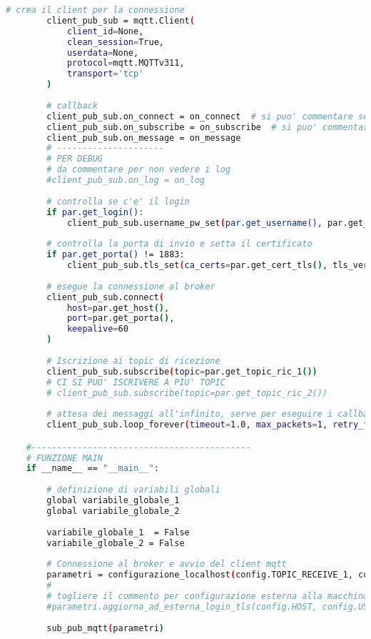 \begin{lstlisting}[language=bash]
        # crea il client per la connessione
        client_pub_sub = mqtt.Client(
            client_id=None,
            clean_session=True,
            userdata=None,
            protocol=mqtt.MQTTv311,
            transport='tcp'
        )
    
        # callback
        client_pub_sub.on_connect = on_connect  # si puo' commentare se non interessa
        client_pub_sub.on_subscribe = on_subscribe  # si puo' commentare se non interessa
        client_pub_sub.on_message = on_message
        # --------------------- 
        # PER DEBUG
        # da commentare per non vedere i log
        #client_pub_sub.on_log = on_log
    
        # controlla se c'e' il login
        if par.get_login():
            client_pub_sub.username_pw_set(par.get_username(), par.get_password())
    
        # controlla la porta di invio e setta il certificato
        if par.get_porta() != 1883:
            client_pub_sub.tls_set(ca_certs=par.get_cert_tls(), tls_version=2)
    
        # esegue la connessione al broker
        client_pub_sub.connect(
            host=par.get_host(),
            port=par.get_porta(),
            keepalive=60
        )
    
        # Iscrizione ai topic di ricezione
        client_pub_sub.subscribe(topic=par.get_topic_ric_1())
        # CI SI PUO' ISCRIVERE A PIU' TOPIC
        # client_pub_sub.subscribe(topic=par.get_topic_ric_2())
    
        # attesa dei messaggi all'infinito, serve per eseguire i callback
        client_pub_sub.loop_forever(timeout=1.0, max_packets=1, retry_first_connection=False)

    #-------------------------------------------
    # FUNZIONE MAIN
    if __name__ == "__main__":
    
        # definizione di variabili globali
        global variabile_globale_1
        global variabile_globale_2
        
        variabile_globale_1  = False
        variabile_globale_2 = False
        
        # Connessione al broker e avvio del client mqtt
        parametri = configurazione_localhost(config.TOPIC_RECEIVE_1, config.TOPIC_RECEIVE_2, config.TOPIC_SEND_1, config.TOPIC_SEND_2)
        #
        # togliere il commento per configurazione esterna alla macchina
        #parametri.aggiorna_ad_esterna_login_tls(config.HOST, config.USER, config.PASSWORD, config.CERT_TLS)
    
        sub_pub_mqtt(parametri)
\end{lstlisting}